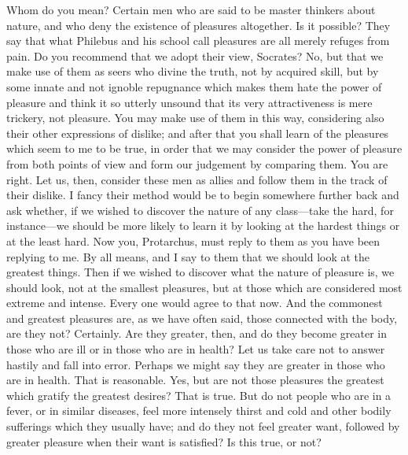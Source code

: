 \documentclass[letterpaper,12pt]{article}
\newcommand{\stephpag}[1]{\marginnote{\small\itshape\fontfamily{ppl}\selectfont #1}}
\begin{document}
\begin{drama}
\protarchusspeaks
Whom do you mean?
\socratesspeaks
Certain men who are said to be master thinkers about nature, and who deny the existence of pleasures altogether.
\protarchusspeaks
Is it possible? \stephpag{c}
\socratesspeaks
They say that what Philebus and his school call pleasures are all merely refuges from pain.
\protarchusspeaks
Do you recommend that we adopt their view, Socrates?
\socratesspeaks
No, but that we make use of them as seers who divine the truth, not by acquired skill, but by some innate and not ignoble repugnance which makes them hate the power of pleasure and think it so utterly unsound that its very attractiveness is mere trickery, not pleasure. \stephpag{d} You may make use of them in this way, considering also their other expressions of dislike; and after that you shall learn of the pleasures which seem to me to be true, in order that we may consider the power of pleasure from both points of view and form our judgement by comparing them.
\protarchusspeaks
You are right.
\socratesspeaks
Let us, then, consider these men as allies and follow them in the track of their dislike. I fancy their method would be to begin somewhere further back \stephpag{e} and ask whether, if we wished to discover the nature of any class---take the hard, for instance---we should be more likely to learn it by looking at the hardest things or at the least hard. Now you, Protarchus, must reply to them as you have been replying to me.
\protarchusspeaks
By all means, and I say to them that we should look at the greatest things.
\socratesspeaks
Then if we wished to discover what the nature of pleasure is, we should look, not at the smallest pleasures, \stephpag{45 a} but at those which are considered most extreme and intense.
\protarchusspeaks
Every one would agree to that now.
\socratesspeaks
And the commonest and greatest pleasures are, as we have often said, those connected with the body, are they not?
\protarchusspeaks
Certainly.
\socratesspeaks
Are they greater, then, and do they become greater in those who are ill or in those who are in health? Let us take care not to answer hastily and fall into error. Perhaps we might say they are greater \stephpag{b} in those who are in health.
\protarchusspeaks
That is reasonable.
\socratesspeaks
Yes, but are not those pleasures the greatest which gratify the greatest desires?
\protarchusspeaks
That is true.
\socratesspeaks
But do not people who are in a fever, or in similar diseases, feel more intensely thirst and cold and other bodily sufferings which they usually have; and do they not feel greater want, followed by greater pleasure when their want is satisfied? Is this true, or not? \stephpag{c}

\end{drama}
\end{document}
